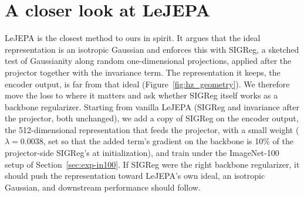 \section{A closer look at LeJEPA}
\label{app:lejepa}

LeJEPA is the closest method to ours in spirit. It argues that the ideal representation is an isotropic Gaussian and enforces this with SIGReg, a sketched test of Gaussianity along random one-dimensional projections, applied after the projector together with the invariance term. The representation it keeps, the encoder output, is far from that ideal (Figure~\ref{fig:hz_geometry}). We therefore move the loss to where it matters and ask whether SIGReg itself works as a backbone regularizer. Starting from vanilla LeJEPA (SIGReg and invariance after the projector, both unchanged), we add a copy of SIGReg on the encoder output, the 512-dimensional representation that feeds the projector, with a small weight ($\lambda=0.0038$, set so that the added term's gradient on the backbone is 10\% of the projector-side SIGReg's at initialization), and train under the ImageNet-100 setup of Section~\ref{sec:exp-in100}. If SIGReg were the right backbone regularizer, it should push the representation toward LeJEPA's own ideal, an isotropic Gaussian, and downstream performance should follow.

